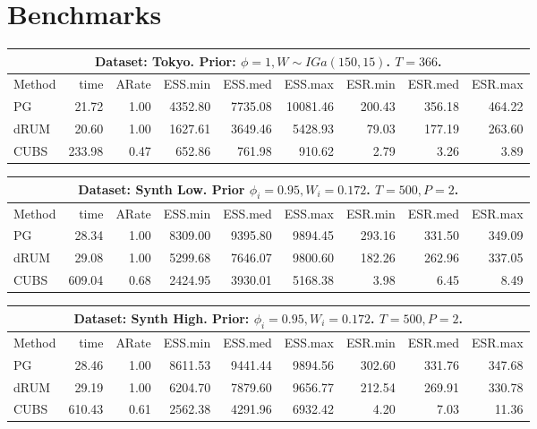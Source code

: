 \documentclass[11pt]{article}
\begin{document}
\section{Benchmarks}

\begin{table}

\begin{tabular}{l r r r r r r r r } 
\hline
\multicolumn{9}{c}{Dataset: Tokyo.  Prior: $\phi = 1, W \sim IGa(150, 15)$.  $T=366$.} \\
\hline
          Method  &     time &    ARate &  ESS.min &  ESS.med &  ESS.max &  ESR.min &  ESR.med &  ESR.max \\ 
              PG  &    21.72 &     1.00 &  4352.80 &  7735.08 & 10081.46 &   200.43 &   356.18 &   464.22 \\ 
            dRUM  &    20.60 &     1.00 &  1627.61 &  3649.46 &  5428.93 &    79.03 &   177.19 &   263.60 \\ 
            CUBS  &   233.98 &     0.47 &   652.86 &   761.98 &   910.62 &     2.79 &     3.26 &     3.89
 \end{tabular}

\begin{tabular}{l r r r r r r r r } 
\hline
\multicolumn{9}{c}{Dataset: Synth Low.  Prior $\phi_i = 0.95, W_i=0.172$.  $T=500,
  P=2$.} \\
\hline
          Method  &     time &    ARate &  ESS.min &  ESS.med &  ESS.max &  ESR.min &  ESR.med &  ESR.max \\ 
              PG  &    28.34 &     1.00 &  8309.00 &  9395.80 &  9894.45 &   293.16 &   331.50 &   349.09 \\ 
            dRUM  &    29.08 &     1.00 &  5299.68 &  7646.07 &  9800.60 &   182.26 &   262.96 &   337.05 \\ 
            CUBS  &   609.04 &     0.68 &  2424.95 &  3930.01 &  5168.38 &     3.98 &     6.45 &     8.49
 \end{tabular}

\begin{tabular}{l r r r r r r r r } 
\hline
\multicolumn{9}{c}{Dataset: Synth High.  Prior: $\phi_i = 0.95, W_i=0.172$.
  $T=500, P=2$.} \\
\hline
          Method  &     time &    ARate &  ESS.min &  ESS.med &  ESS.max &  ESR.min &  ESR.med &  ESR.max \\ 
              PG  &    28.46 &     1.00 &  8611.53 &  9441.44 &  9894.56 &   302.60 &   331.76 &   347.68 \\ 
            dRUM  &    29.19 &     1.00 &  6204.70 &  7879.60 &  9656.77 &   212.54 &   269.91 &   330.78 \\ 
            CUBS  &   610.43 &     0.61 &  2562.38 &  4291.96 &  6932.42 &     4.20 &     7.03 &    11.36
 \end{tabular}


\end{table}
\end{document}
